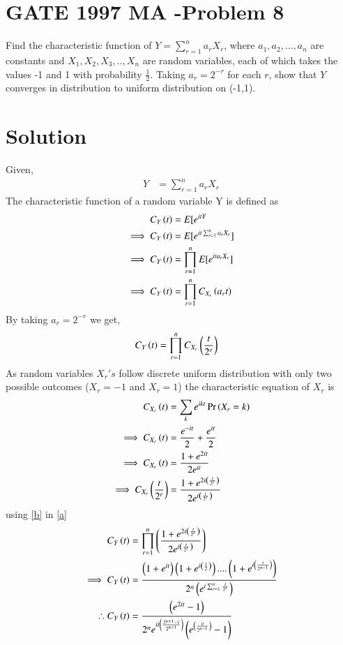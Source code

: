 \documentclass[journal,12pt,twocolumn]{IEEEtran}
\begin{document}
\section*{GATE 1997 MA -Problem 8}
    Find the characteristic function of $Y=\sum_{r=1}^{n}a_rX_r$, where $a_1,a_2,...,a_n$ are constants and $X_1,X_2,X_3,..,X_n$ are random variables, each of which takes the values -1 and 1 with probability $\frac{1}{2}$. Taking $a_r=2^{-r}$ for each $r$, show that $Y$ converges in distribution to uniform distribution on (-1,1).
   
\section*{Solution}
Given,
\begin{align}
    Y&=\sum_{r=1}^{n}a_rX_r
\end{align}
The characteristic function of a random variable Y is defined as
\begin{align}
    C_{Y}\left(t\right)&=E[e^{itY}\\
    \implies C_{Y}\left(t\right)&=E[e^{it\sum_{r=1}^{n}a_rX_r}]\\
    \implies C_{Y}\left(t\right)&=\prod_{r=1}^{n}E[e^{ita_rX_r}]\\
    \implies C_{Y}\left(t\right)&=\prod_{r=1}^{n}C_{X_r}\left(a_rt\right)
\end{align}
By taking $a_r=2^{-r}$ we get,
\begin{align}
    C_{Y}\left(t\right)&=\prod_{r=1}^{n}C_{X_r}\left(\frac{t}{2^r}\right)
    \label{a}
\end{align}
As random variables $X_r's$ follow discrete uniform distribution with only two possible outcomes ($X_r=-1$ and $X_r=1$) the characteristic equation of $X_r$ is
\begin{align}
    C_{X_r}\left(t\right)&=\sum_{k}e^{ikt}\Pr\left(X_r=k\right)\\
    \implies C_{X_r}\left(t\right)&=\frac{e^{-it}}{2}+\frac{e^{it}}{2}\\
    \implies C_{X_r}\left(t\right)&=\frac{1+e^{2it}}{2e^{it}}\\
    \implies C_{X_r}\left(\frac{t}{2^r}\right)&=\frac{1+e^{2i\left(\frac{t}{2^r}\right)}}{2e^{i\left(\frac{t}{2^r}\right)}}
        \label{b}
\end{align}
using \eqref{b} in \eqref{a}
\begin{align}
    C_{Y}\left(t\right)&=\prod_{r=1}^{n}\left(\frac{1+e^{2i\left(\frac{t}{2^r}\right)}}{2e^{i\left(\frac{t}{2^r}\right)}}\right)\\
    \implies C_{Y}\left(t\right)&=\frac{\left(1+e^{it}\right)\left(1+e^{i\left(\frac{t}{2}\right)}\right)....\left(1+e^{i\left(\frac{t}{2^{n-1}}\right)}\right)}{2^n\left(e^{i\sum_{r=1}^n\frac{t}{2^r}}\right)}\\
     \therefore C_{Y}\left(t\right)&=\frac{\left(e^{2it}-1\right)}{2^ne^{it\left(\frac{2^{n+1}-1}{2^{n+1}}\right)}\left(e^{\left(\frac{it}{2^{n-1}}\right)}-1\right)}
     \label{c}
\end{align}
\end{document}
